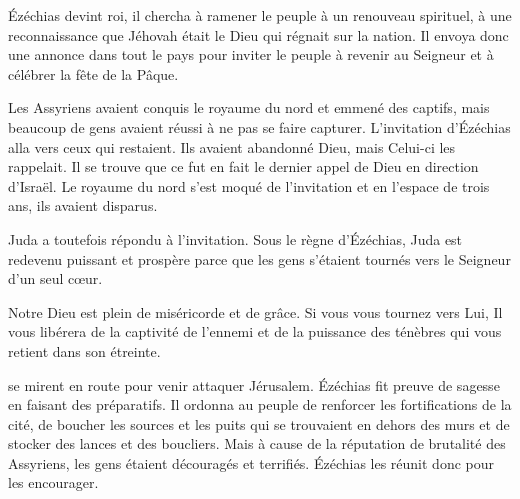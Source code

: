  Ézéchias devint roi, il chercha à ramener le peuple
 à un renouveau spirituel, à une reconnaissance que Jéhovah était le Dieu
 qui régnait sur la nation.
 Il envoya donc une annonce dans tout le pays pour inviter le peuple
 à revenir au Seigneur et à célébrer la fête de la Pâque.

Les Assyriens avaient conquis le royaume du nord et emmené des captifs,
 mais beaucoup de gens avaient réussi à ne pas se faire capturer.
 L'invitation d'Ézéchias alla vers ceux qui restaient.
 Ils avaient abandonné Dieu, mais Celui-ci les rappelait.
 Il se trouve que ce fut en fait le dernier appel de Dieu en direction d'Israël.
 Le royaume du nord s'est moqué de l'invitation et en l'espace de trois ans,
 ils avaient disparus. 


Juda a toutefois répondu à l'invitation. Sous le règne d'Ézéchias,
 Juda est redevenu puissant et prospère parce que les gens s'étaient
 tournés vers le Seigneur d'un seul cœur.

Notre Dieu est plein de miséricorde et de grâce.
 Si vous vous tournez vers Lui, Il vous libérera de la captivité
 de l'ennemi et de la puissance des ténèbres qui vous retient
 dans son étreinte. 

\dvrule









 se mirent en route pour venir attaquer Jérusalem.
 Ézéchias fit preuve de sagesse en faisant des préparatifs.
 Il ordonna au peuple de renforcer les fortifications de la cité,
 de boucher les sources et les puits qui se trouvaient en dehors des murs
 et de stocker des lances et des boucliers.
 Mais à cause de la réputation de brutalité des Assyriens,
 les gens étaient découragés et terrifiés.
 Ézéchias les réunit donc pour les encourager.

